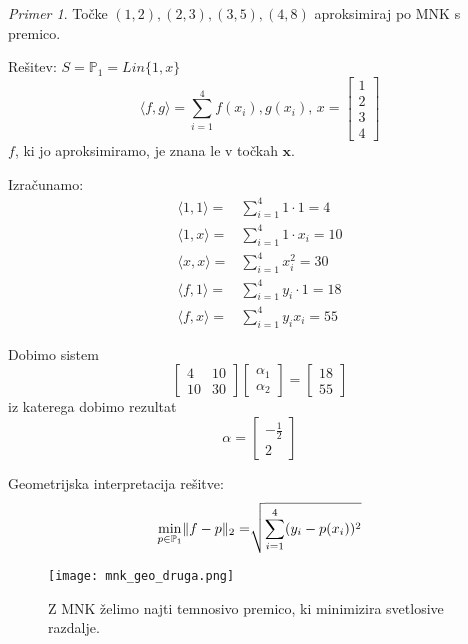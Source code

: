 \documentclass[a4paper,12pt]{article}
\DeclarePairedDelimiter\norm{\lVert}{\rVert}
\newcommand{\innerproduct}[2]{\langle #1, #2 \rangle}
\theoremstyle{definition}
\theoremstyle{remark}
\newtheorem*{ex}{Primer}
\newcommand{\Pp}{\mathbb{P}}
\begin{document}
\begin{ex}
    Točke $(1, 2), (2, 3), (3, 5), (4, 8)$ aproksimiraj po MNK s premico.

    Rešitev:
    $S = \Pp_1 = Lin\{1, x\}$
    \begin{equation*}
        \innerproduct{f}{g} = \sum_{i = 1}^{4} f(x_i), g(x_i) \text{, } x =
        \begin{bmatrix}
            1 \\
            2 \\
            3 \\
            4
        \end{bmatrix}
    \end{equation*}
    $f$, ki jo aproksimiramo, je znana le v točkah $\textbf{x}$.

    Izračunamo:
    \begin{align*}
        \innerproduct{1}{1} =& \sum_{i = 1}^{4}1\cdot 1 = 4 \\
        \innerproduct{1}{x} =& \sum_{i = 1}^{4}1\cdot x_i = 10 \\
        \innerproduct{x}{x} =& \sum_{i = 1}^{4}x_i^2 = 30 \\
        \innerproduct{f}{1} =& \sum_{i = 1}^{4} y_i \cdot 1 = 18 \\
        \innerproduct{f}{x} =& \sum_{i = 1}^{4} y_i x_i = 55
    \end{align*}

    Dobimo sistem
    \begin{equation*}
        \begin{bmatrix}
            4 & 10 \\
            10 & 30
        \end{bmatrix}
        \begin{bmatrix}
            \alpha_1 \\
            \alpha_2
        \end{bmatrix}
        =
        \begin{bmatrix}
            18 \\
            55
        \end{bmatrix}
    \end{equation*}
    iz katerega dobimo rezultat
    \[ \alpha = 
        \begin{bmatrix}
            -\frac{1}{2} \\
            2
        \end{bmatrix}\]

    Geometrijska interpretacija rešitve:
    \begin{equation*}
        \min_{p \in \Pp_1} \norm{f - p}_2 =\sqrt[]{\sum_{i = 1}^{4} (y_i -p(x_i))^2}
    \end{equation*}
    \begin{figure}[H]
        \center
        \texttt{[image: mnk\_geo\_druga.png]}
        \caption{Z MNK želimo najti temnosivo premico, ki minimizira svetlosive razdalje.}
    \end{figure}
\end{ex}
\end{document}

